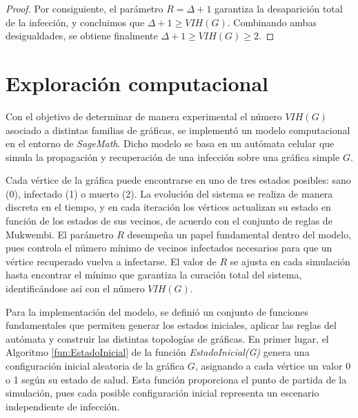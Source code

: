 \documentclass[12pt,titlepage,twoside,openright]{book}
\begin{document}
\begin{proof}
    Por consiguiente, el par\'ametro $R= \Delta +1$ garantiza la desaparici\'on total de la infecci\'on, y concluimos que $\Delta+1\geq VIH(G)$. Combinando ambas desigualdades, se obtiene finalmente $\Delta+1\geq VIH(G) \geq 2$.
\end{proof}
\section{Exploraci\'on computacional}
Con el objetivo de determinar de manera experimental el n\'umero $VIH(G)$ asociado a distintas familias de gr\'aficas, se implement\'o un modelo computacional en el entorno de \textit{SageMath}. Dicho modelo se basa en un aut\'omata celular que simula la propagaci\'on y recuperaci\'on de una infecci\'on sobre una gr\'afica simple $G$.

Cada v\'ertice de la gr\'afica puede encontrarse en uno de tres estados posibles: sano (0), infectado (1) o muerto (2). La evoluci\'on del sistema se realiza de manera discreta en el tiempo, y en cada iteraci\'on los v\'ertices actualizan su estado en funci\'on de los estados de sus vecinos, de acuerdo con el conjunto de reglas de Mukwembi. El par\'ametro $R$ desempe\~na un papel fundamental dentro del modelo, pues controla el n\'umero m\'inimo de vecinos infectados necesarios para que un v\'ertice recuperado vuelva a infectarse. El valor de $R$ se ajusta en cada simulaci\'on hasta encontrar el m\'inimo que garantiza la curaci\'on total del sistema, identific\'andose as\'i con el n\'umero $VIH(G)$.

Para la implementaci\'on del modelo, se defini\'o un conjunto de funciones fundamentales que permiten generar los estados iniciales, aplicar las reglas del aut\'omata y construir las distintas topolog\'ias de gr\'aficas. En primer lugar, el Algoritmo \ref{fun:EstadoInicial} de la funci\'on \textit{EstadoInicial(G)} genera una configuraci\'on inicial aleatoria de la gr\'afica $G$, asignando a cada v\'ertice un valor 0 o 1 seg\'un su estado de salud. Esta funci\'on proporciona el punto de partida de la simulaci\'on, pues cada posible configuraci\'on inicial representa un escenario independiente de infecci\'on.
\end{document}
